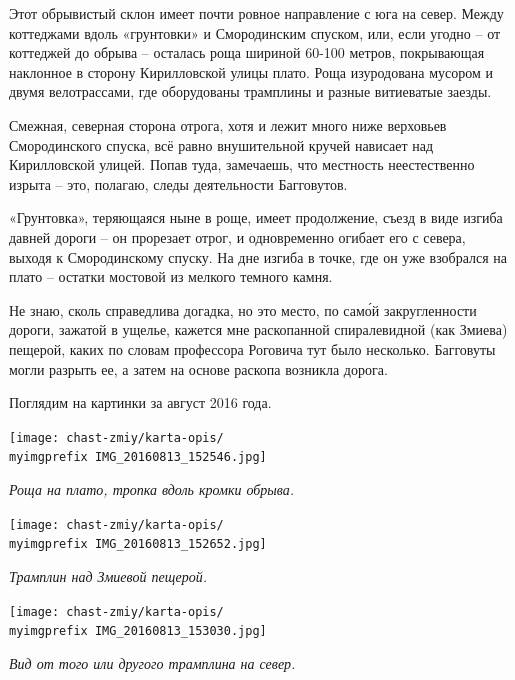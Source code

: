 Этот обрывистый склон имеет почти ровное направление с юга на север. Между коттеджами вдоль «грунтовки» и Смородинским спуском, или, если угодно – от коттеджей до обрыва – осталась роща шириной 60-100 метров, покрывающая наклонное в сторону Кирилловской улицы плато.  Роща изуродована мусором и двумя велотрассами, где оборудованы трамплины и разные витиеватые заезды.

Смежная, северная сторона отрога, хотя и лежит много ниже верховьев Смородинского спуска, всё равно внушительной кручей нависает над Кирилловской улицей. Попав туда, замечаешь, что местность неестественно изрыта – это, полагаю, следы деятельности Багговутов.

«Грунтовка», теряющаяся ныне в роще, имеет продолжение, съезд в виде изгиба давней дороги – он прорезает отрог, и одновременно огибает его с севера, выходя к Смородинскому спуску. На дне изгиба в точке, где он уже взобрался на плато – остатки мостовой из мелкого темного камня.

Не знаю, сколь справедлива догадка, но это место, по сам\'ой закругленности дороги, зажатой в ущелье, кажется мне раскопанной спиралевидной (как Змиева) пещерой, каких по словам профессора Роговича тут было несколько. Багговуты могли разрыть ее, а затем на основе раскопа возникла дорога.

Поглядим на картинки за август 2016 года. 


\begin{center}
\texttt{[image: chast-zmiy/karta-opis/\\myimgprefix IMG\_20160813\_152546.jpg]}

\textit{Роща на плато, тропка вдоль кромки обрыва.}
\end{center}

\begin{center}
\texttt{[image: chast-zmiy/karta-opis/\\myimgprefix IMG\_20160813\_152652.jpg]}

\textit{Трамплин над Змиевой пещерой.}
\end{center}

\newpage

\begin{center}
\texttt{[image: chast-zmiy/karta-opis/\\myimgprefix IMG\_20160813\_153030.jpg]}

\textit{Вид от того или другого трамплина на север.}
\end{center}

